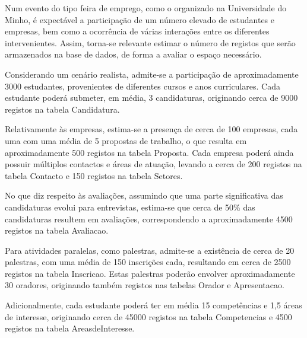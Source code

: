\documentclass[12pt,a4paper]{article}
\begin{document}
Num evento do tipo feira de emprego, como o organizado na Universidade do Minho,
é expectável a participação de um número elevado de estudantes e empresas, bem
como a ocorrência de várias interações entre os diferentes intervenientes.
Assim, torna-se relevante estimar o número de registos que serão armazenados na
base de dados, de forma a avaliar o espaço necessário.

Considerando um cenário realista, admite-se a participação de aproximadamente
3000 estudantes, provenientes de diferentes cursos e anos curriculares. Cada
estudante poderá submeter, em média, 3 candidaturas, originando cerca de 9000
registos na tabela Candidatura.

Relativamente às empresas, estima-se a presença de cerca de 100 empresas, cada
uma com uma média de 5 propostas de trabalho, o que resulta em aproximadamente
500 registos na tabela Proposta. Cada empresa poderá ainda possuir múltiplos
contactos e áreas de atuação, levando a cerca de 200 registos na tabela Contacto
e 150 registos na tabela Setores.

No que diz respeito às avaliações, assumindo que uma parte significativa das
candidaturas evolui para entrevistas, estima-se que cerca de 50\% das
candidaturas resultem em avaliações, correspondendo a aproximadamente 4500
registos na tabela Avaliacao.

Para atividades paralelas, como palestras, admite-se a existência de cerca de 20
palestras, com uma média de 150 inscrições cada, resultando em cerca de 2500
registos na tabela Inscricao. Estas palestras poderão envolver aproximadamente
30 oradores, originando também registos nas tabelas Orador e Apresentacao.

Adicionalmente, cada estudante poderá ter em média 15 competências e 1,5 áreas de
interesse, originando cerca de 45000 registos na tabela Competencias e 4500
registos na tabela AreasdeInteresse.
\end{document}
